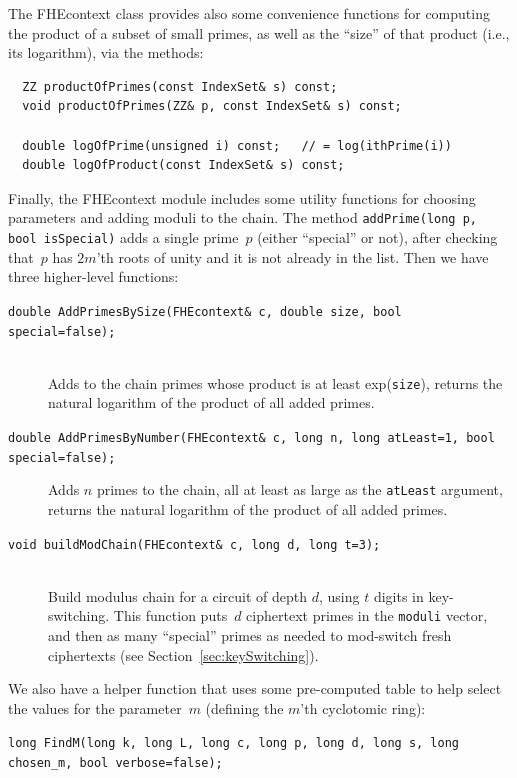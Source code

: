 \documentclass[14pt]{extarticle}
\newcommand{\secref}[1]{Section~\protect\ref{sec:#1}}
\def\FHEcontext{\textsf{FHEcontext}}
\begin{document}
The {\FHEcontext} class provides also some convenience functions for
computing the product of a subset of small primes, as well as the
``size'' of that product (i.e., its logarithm), via the methods:

\begin{verbatim}
  ZZ productOfPrimes(const IndexSet& s) const;
  void productOfPrimes(ZZ& p, const IndexSet& s) const;

  double logOfPrime(unsigned i) const;   // = log(ithPrime(i))
  double logOfProduct(const IndexSet& s) const;
\end{verbatim}

Finally, the {\FHEcontext} module includes some utility functions for
choosing parameters and adding moduli to the chain.
The method \texttt{addPrime(long p, bool isSpecial)} adds a single
prime~$p$ (either ``special'' or not), after checking that~$p$ has
$2m$'th roots of unity and it is not already in the list. Then we
have three higher-level functions:

\begin{description}
\item[\texttt{double AddPrimesBySize(FHEcontext\& c, double size, bool special=false);}]\ \\
Adds to the chain primes whose product is at least exp(\texttt{size}), returns the natural logarithm of the product of all added primes.

\item[\texttt{double AddPrimesByNumber(FHEcontext\& c, long n, long atLeast=1, bool special=false);}]
Adds $n$ primes to the chain, all at least as large as the \texttt{atLeast} argument, returns the natural logarithm of the product of all added primes.

\item[\texttt{void buildModChain(FHEcontext\& c, long d, long t=3);}]\ \\
Build modulus chain for a circuit of depth $d$, using $t$ digits in key-switching. This function puts~$d$ ciphertext primes in the \texttt{moduli} vector, and then as many ``special'' primes as needed to mod-switch fresh ciphertexts
(see \secref{keySwitching}).
\end{description}
We also have a helper function that uses some pre-computed table to
help select the values for the parameter~$m$ (defining the $m$'th
cyclotomic ring):

\smallskip
\texttt{long FindM(long k, long L, long c, long p, long d, long s, long chosen\_m, bool verbose=false);}
\end{document}
